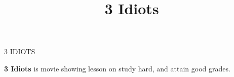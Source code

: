 \documentclass{Article}
\title{3 Idiots}
\begin{document}
\begin{center} \LARGE 3 IDIOTS
\end{center}
\vsapce{8mm}
\Large{
\begin{center}\textbf{3 Idiots} is movie showing lesson on study hard, and attain good grades. \end{center}}
\end{document}

